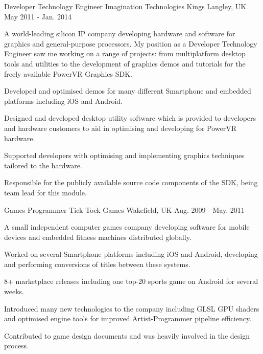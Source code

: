 \begin{cventries}
  \cventry
    {Developer Technology Engineer} %
    {Imagination Technologies} %
    {Kings Langley, UK} %
    {May 2011 - Jan. 2014} %
    {
      \begin{cventrysummary}
      A world-leading silicon IP company developing hardware and software for 
      graphics and general-purpose processors. My position as a Developer 
      Technology Engineer saw me working on a range of projects: from 
      multiplatform desktop tools and utilities to the development of graphics
      demos and tutorials for the freely available PowerVR Graphics SDK.
      \end{cventrysummary}
      \begin{cvitems} %
        \item {Developed and optimised demos for many different Smartphone and embedded platforms including iOS and Android.}
        \item {Designed and developed desktop utility software which is provided to developers and hardware customers to aid in optimising and developing for PowerVR hardware.}
        \item {Supported developers with optimising and implementing graphics techniques tailored to the hardware.}
        \item {Responsible for the publicly available source code components of the SDK, being team lead for this module.}
      \end{cvitems}
    }

  \cventry
    {Games Programmer} %
    {Tick Tock Games} %
    {Wakefield, UK} %
    {Aug. 2009 - May. 2011} %
    {
      \begin{cventrysummary}
      A small independent computer games company developing software for mobile
      devices and embedded fitness machines distributed globally.
      \end{cventrysummary}
      \begin{cvitems} %
        \item {Worked on several Smartphone platforms including iOS and Android, developing and performing conversions of titles between these systems. }
        \item {8+ marketplace releases including one top-20 sports game on Android for several weeks.}
        \item {Introduced many new technologies to the company including GLSL GPU shaders and optimised engine tools for improved Artist-Programmer pipeline efficiency.}
        \item {Contributed to game design documents and was heavily involved in the design process. }
      \end{cvitems}
    }

\end{cventries}
